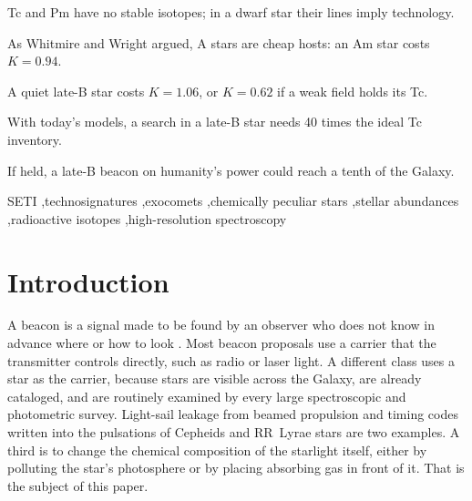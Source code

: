 \documentclass[final,5p]{elsarticle}
\begin{document}
\begin{frontmatter}
\begin{highlights}
\item Tc and Pm have no stable isotopes; in a dwarf star their lines imply technology.
\item As Whitmire and Wright argued, A stars are cheap hosts: an Am star costs $K = 0.94$.
\item A quiet late-B star costs $K = 1.06$, or $K = 0.62$ if a weak field holds its Tc.
\item With today's models, a search in a late-B star needs 40 times the ideal Tc inventory.
\item If held, a late-B beacon on humanity's power could reach a tenth of the Galaxy.
\end{highlights}

\begin{keyword}
SETI \sep technosignatures \sep exocomets \sep chemically peculiar stars \sep stellar abundances \sep radioactive isotopes \sep high-resolution spectroscopy
\end{keyword}

\end{frontmatter}


\section{Introduction}
\label{sec:intro}

A beacon is a signal made to be found by an observer who does not know in advance where or how to look \citep{Wright2021strategies}. Most beacon proposals use a carrier that the transmitter controls directly, such as radio or laser light. A different class uses a star as the carrier, because stars are visible across the Galaxy, are already cataloged, and are routinely examined by every large spectroscopic and photometric survey. Light-sail leakage from beamed propulsion \citep{Guillochon2015} and timing codes written into the pulsations of Cepheids and RR~Lyrae stars \citep{Learned2012} are two examples. A third is to change the chemical composition of the starlight itself, either by polluting the star's photosphere or by placing absorbing gas in front of it. That is the subject of this paper.
\end{document}
